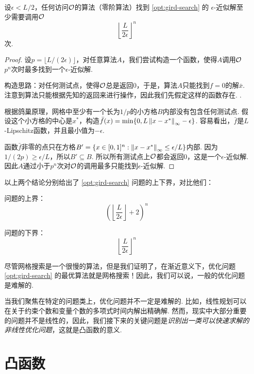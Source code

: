 \begin{theorem}\label{thm:gird-search-lower-bound}
    设$\epsilon<L/2$，任何访问$\mathcal{O}$的算法（零阶算法）找到 \eqref{opt:gird-search} 的 $\epsilon$-近似解至少需要调用$\mathcal{O}$
    \[\left\lfloor\frac{L}{2\epsilon}\right\rfloor^n\]
    次.
\end{theorem}
\begin{proof}
设$p=\lfloor L/(2\epsilon)\rfloor$，对任意算法$A$，我们尝试构造一个函数，使得$A$调用$\mathcal{O}$ $p^n$次时最多找到一个$\epsilon$-近似解.

构造思路：对任何测试点，使得$\mathcal{O}$总是返回$0$，于是，算法$A$只能找到$f=0$的解$\bar{x}$. 注意到算法只能根据先知的返回来进行操作，因此我们先假定这样的函数存在. . 

根据鸽巢原理，网格中至少有一个长为$1/p$的小方格$B$内部没有包含任何测试点. 假设这个小方格的中心是$x^*$，构造$\bar f(x)=\min\{0,L\left\|x-x^*\right\|_\infty-\epsilon\}$. 容易看出，$\bar f$是$L$-Lipschitz函数，并且最小值为$-\epsilon$.

函数$\bar f$非零的点只在方格$B'=\{x\in[0,1]^n:\left\|x-x^*\right\|_\infty\leq\epsilon/L\}$内部. 因为$1/(2p)\geq \epsilon/L$，所以$B'\subseteq B$. 所以所有测试点上$\mathcal{O}$都会返回$0$，这是一个$\epsilon$-近似解. 因此$A$通过小于$p^n$次对$\mathcal{O}$的调用最多只能找到$\epsilon$-近似解.
\end{proof}

以上两个结论分别给出了 \eqref{opt:gird-search} 问题的上下界，对比他们：
\begin{center}
\begin{minipage}[t]{0.4\textwidth}
问题的上界：
\[\left(\left\lfloor\frac{L}{2\epsilon}\right\rfloor+2\right)^n\]
\end{minipage}
\begin{minipage}[t]{0.4\textwidth}
问题的下界：
    \[\left\lfloor\frac{L}{2\epsilon}\right\rfloor^n\]
\end{minipage}
\end{center}
尽管网格搜索是一个很慢的算法，但是我们证明了，在渐近意义下，优化问题 \eqref{opt:gird-search} 的最优算法就是网格搜索！因此，我们可以说，一般的优化问题是难解的. 

当我们聚焦在特定的问题类上，优化问题并不一定是难解的. 比如，线性规划可以在关于约束个数和变量个数的多项式时间内解出精确解. 然而，现实中大部分重要的问题并不是线性的，因此，我们接下来的关键问题是\textit{识别出一类可以快速求解的非线性优化问题}，这就是凸函数的意义. 


\section{凸函数}


